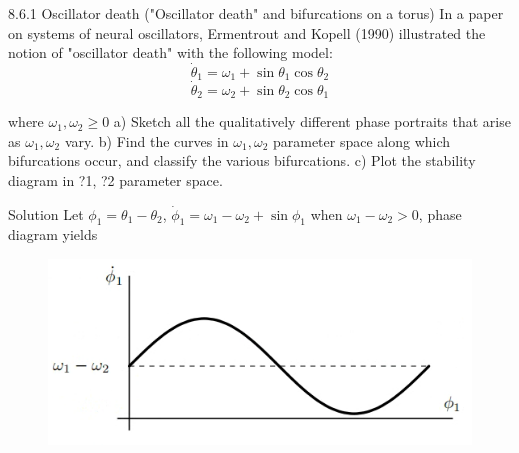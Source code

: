 \documentclass[9pt,aspectratio=43,mathserif,table]{beamer}
\begin{document}
\begin{frame}[label=current]{8.6.1 Oscillator death}
 ("Oscillator death" and bifurcations on a torus) In a paper on systems of neural oscillators, Ermentrout and Kopell (1990) illustrated the notion of "oscillator death" with the following model:
$$\dot\theta_1 = \omega _1 + \sin\theta_1\cos\theta_2$$
$$\dot\theta_2 = \omega _2 + \sin\theta_2\cos\theta_1$$

where $\omega_1, \omega_2 \ge 0$
a) Sketch all the qualitatively different phase portraits that arise as $\omega_1, \omega _2$ vary.
b) Find the curves in $\omega_1, \omega _2$ parameter space along which bifurcations occur, and
classify the various bifurcations.
c) Plot the stability diagram in ?1, ?2 parameter space.
\end{frame}
\begin{frame}[label=current]{Solution}
Let $\phi_1 = \theta_1 - \theta_2$, $\dot \phi_1 = \omega_1 - \omega _2 + \sin \phi_1$
when $\omega_1 - \omega_2 > 0$, phase diagram yields
    \begin{figure}[!h]
      \centering
      \includegraphics[width=.3\textwidth]{fig/RustDesk_bjmJSrgW2D.png}
    \end{figure}


\end{frame}
\end{document}
